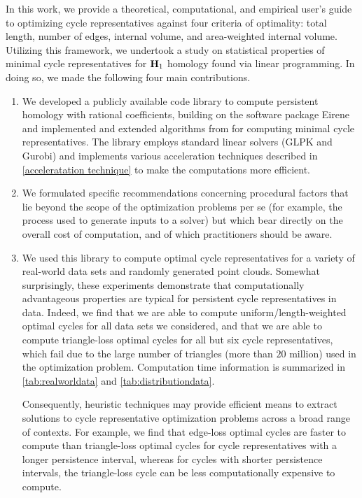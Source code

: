In this work, we provide a theoretical, computational, and empirical user's guide to optimizing cycle representatives against four criteria of optimality: total length, number of edges, internal volume, and area-weighted internal volume. Utilizing this framework, we undertook a study on statistical properties of minimal cycle representatives for $\mathbf{H}_1$ homology found via linear programming. In doing so, we made the following four main contributions.
\begin{enumerate}
    \item We developed a publicly available code library \cite{li_thompson} to compute persistent homology with rational coefficients, building on the software package Eirene \cite{eirene} and implemented and extended algorithms from \cite{Escolar2016, Obayashi2018}  for computing minimal cycle representatives. The library employs standard linear solvers (GLPK and Gurobi) and implements various acceleration techniques described in \se \ref{acceleratation technique} to make the computations more efficient. 
    \item We formulated specific recommendations concerning procedural factors that lie beyond the scope of the optimization problems per se (for example, the process used to generate inputs to a solver) but which bear directly on the overall cost of computation, and of which practitioners should be aware. 
    \item We used this library to compute optimal cycle representatives for a variety of real-world data sets and randomly generated point clouds.  Somewhat surprisingly, these experiments demonstrate that computationally advantageous properties are typical for persistent cycle representatives in data. Indeed, we find that we are able to compute uniform/length-weighted optimal cycles for all data sets we considered, and that we are able to compute triangle-loss optimal cycles for all but six cycle representatives, which fail due to the large number of triangles (more than $20$ million) used in the optimization problem. Computation time information is summarized in \tab \ref{tab:realworldata} and \tab \ref{tab:distributiondata}. 
    
    Consequently, heuristic techniques may provide efficient means to extract solutions to cycle representative optimization problems across a broad range of contexts. For example, we find that edge-loss optimal cycles are faster to compute than triangle-loss optimal cycles for cycle representatives with a longer persistence interval, whereas for cycles with shorter persistence intervals, the triangle-loss cycle can be less computationally expensive to compute.
    

\end{enumerate}
